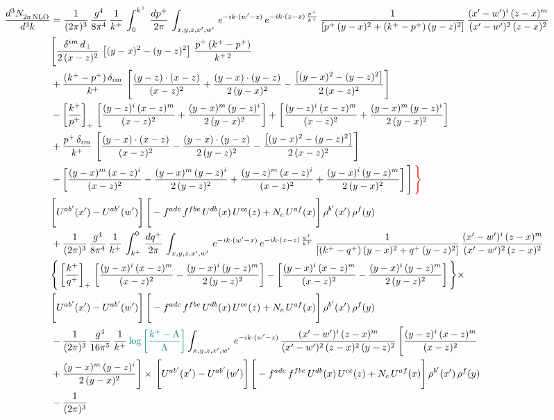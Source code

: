 \documentclass[9pt]{article}
\numberwithin{equation}{section}
\begin{document}
\begin{align}
    \frac{d^{3}N_{2a\,\rm NLO}^{\rm}}{d^{3}k}  & =  \frac{1}{(2\pi)^{3}}\, \frac{g^{4}}{8\pi^{4}}\,\frac{1}{k^{+}}\,\int_{0}^{k^{+}}\, \frac{dp^{+}}{2\pi}\,\int_{x,y,z,x',w'}\, e^{-ik\cdot(w'-z)}\,e^{-ik\cdot (z-x)\,\frac{p^{+}}{k^{+}}}\,\frac{1}{\left[p^{+}\,(y-x)^{2}+(k^{+}-p^{+})\,(y-z)^{2}\right]}\, \frac{(x'-w')^{i}\,(z-x)^{m}}{(x'-w')^{2}\,(z-x)^{2}} \notag \\ & \Bigg[\frac{\delta^{im}\,d_{\perp}}{2\,(x-z)^{2}}\,\left[(y-x)^{2}-(y-z)^{2}\right]\,\frac{p^{+}\,(k^{+}-p^{+})}{k^{+\,2}}\notag \\ & +\frac{(k^{+}-p^{+})\,\delta_{im}}{k^{+}}\,\left[\frac{(y-z)\cdot (x-z)}{(x-z)^{2}}+\frac{(y-x)\cdot (y-z)}{2\,(y-x)^{2}}-\frac{\left[(y-x)^{2}-(y-z)^{2}\right]}{2\,(x-z)^{2}}\right]\notag \\ & -\left[\frac{k^{+}}{p^{+}}\right]_{+}\,\left[\frac{(y-z)^{i}\,(x-z)^{m}}{(x-z)^{2}}+\frac{(y-x)^{m}\,(y-z)^{i}}{2\,(y-x)^{2}}\right]+ \left[\frac{(y-z)^{i}\,(x-z)^{m}}{(x-z)^{2}}+\frac{(y-x)^{m}\,(y-z)^{i}}{2\,(y-x)^{2}}\right]\notag \\ & +\frac{p^{+}\,\delta_{im}}{k^{+}}\,\left[\frac{(y-x)\cdot (x-z)}{(x-z)^{2}}-\frac{(y-x)\cdot (y-z)}{2\,(y-z)^{2}}-\frac{\left[(y-x)^{2}-(y-z)^{2}\right]}{2\,(x-z)^{2}}\right]\notag \\ &-\left[\frac{(y-x)^{m}\,(x-z)^{i}}{(x-z)^{2}}-\frac{(y-x)^{m}\,(y-z)^{i}}{2\,(y-z)^{2}}+\frac{(y-z)^{m}\,(x-z)^{i}}{(x-z)^{2}}+\frac{(y-x)^{i}\,(y-z)^{m}}{2\,(y-x)^{2}}\right]\Bigg]\,{\color{red}\Bigg\}} \notag \\ & \Bigg[U^{ab'}(x')-U^{ab'}(w')\Bigg]\,\Bigg[-f^{adc}\,f^{fbe}\,U^{db}(x)\,U^{ce}(z)+N_{c}\,U^{af}(x)\Bigg]\,\rho^{b'}(x')\,\rho^{f}(y)\notag \\ & + \frac{1}{(2\pi)^{3}}\,\frac{g^{4}}{8\pi^{4}}\,\frac{1}{k^{+}}\, \int^{0}_{k^{+}}\, \frac{dq^{+}}{2\pi} \,  \int_{x,y,z,x',w'}\,e^{-ik\cdot(w'-x)}\,e^{-ik\cdot (x-z)\,\frac{q^{+}}{k^{+}}}\,\frac{1}{\left[(k^{+}-q^{+})\,(y-x)^{2}+q^{+}\,(y-z)^{2}\right]}\, \frac{(x'-w')^{i}\,(z-x)^{m}}{(x'-w')^{2}\,(z-x)^{2}} \notag \\ &\Bigg\{\left[\frac{k^{+}}{q^{+}}\right]_{+}\,\left[\frac{(y-x)^{i}\,(x-z)^{m}}{(x-z)^{2}}-\frac{(y-x)^{i}\,(y-z)^{m}}{2\,(y-z)^{2}}\right] -\left[\frac{(y-x)^{i}\,(x-z)^{m}}{(x-z)^{2}}-\frac{(y-x)^{i}\,(y-z)^{m}}{2\,(y-z)^{2}}\right]\Bigg\}\times\,\notag \\ & \Bigg[U^{ab'}(x')-U^{ab'}(w')\Bigg]\,\Bigg[-f^{adc}\,f^{fbe}\,U^{db}(x)\,U^{ce}(z)+N_{c}\,U^{af}(x)\Bigg]\,\rho^{b'}(x')\,\rho^{f}(y)\notag \\ & - \frac{1}{(2\pi)^{3}}\, \frac{g^{4}}{16\pi^{5}}\,\frac{1}{k^{+}}\,{\color{teal}\log{\left[\frac{k^{+}-\Lambda}{\Lambda}\right]}} \int_{x,y,z,x',w'}\,e^{-ik\cdot(w'-z)}\, \frac{(x'-w')^{i}\,(z-x)^{m}}{(x'-w')^{2}\,(z-x)^{2}\, (y-z)^{2}}\,\Bigg[\frac{(y-z)^{i}\,(x-z)^{m}}{(x-z)^{2}}\notag \\ & +\frac{(y-x)^{m}\,(y-z)^{i}}{2\,(y-x)^{2}}\Bigg]\times\, \Bigg[U^{ab'}(x')-U^{ab'}(w')\Bigg]\,\Bigg[-f^{adc}\,f^{fbe}\,U^{db}(x)\,U^{ce}(z)+N_{c}\,U^{af}(x)\Bigg]\,\rho^{b'}(x')\,\rho^{f}(y)\notag \\ & - \frac{1}{(2\pi)^{3}}\, 
\end{align}
\end{document}
